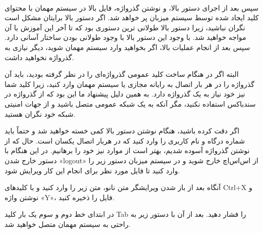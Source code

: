 \
\begin{latin}
    
\end{latin}
سپس بعد از اجرای دستور بالا، و نوشتن گذرواژه، فایل بالا در سیستم مهمان با محتوای کلید ایجاد شده توسط سیستم میزبان پر خواهد شد.  اگر دستور بالا برایتان مشکل است نگران نباشید، زیرا دستور بالا طولانی ترین دستوری بود که تا آخر این آموزش با آن مواجه خواهید شد. با وجود این دستور بالا با وجود طولانی بودن ساختار آسانی دارد. سپس بعد از انجام عملیات بالا، اگر بخواهید وارد سیستم مهمان شوید، دیگر نیازی به گذرواژه نخواهید داشت. 

البته اگر در هنگام ساخت کلید عمومی گذرواژه‌ای را در نظر گرفته بودید، باید آن گذرواژه را در هر بار اتصال به رایانه مجازی یا سیستم مهمان وارد کنید، زیرا کلید شما نیز خود نیاز به یک گذرواژه دارد. به همین دلیل پیشنهاد ما این بود که از گذرواژه در سندباکس استفاده نکنید، مگر آنکه به یک شبکه عمومی متصل باشید و از جهات امنیتی شبکه خود نگران هستید.
\\
\begin{latin}
    
\end{latin}
اگر دقت کرده باشید، هنگام نوشتن دستور بالا کمی خسته خواهید شد و حتماً باید شماره درگاه و نام کاربری را وارد کنید که در هربار اتصال یکسان است. حال که از نوشتن گذرواژه آسوده شدیم، بهتر است از موارد نیز  خود را برهانیم. در این هنگام با دستور خارج شدن «logout» از اس‌اس‌اچ خارج شوید و در سیستم میزبان دستور زیر را وارد کنید تا فایل مورد نظر برای انجام این کار ویرایش شود.
\\
\begin{latin}
    
\end{latin}
آنگاه بعد از باز شدن ویرایشگر متن نانو، متن زیر را وارد کنید و با کلید‌های Ctrl+X و نوشتن واژه «Y»، فایل را ذخیره کنید.
\\

\begin{latin}
    
\end{latin}

در ابتدای خط دوم و سوم یک بار کلید Tab را فشار دهید. بعد از آن با دستور زیر به راحتی به سیستم مهمان متصل خواهید شد.

